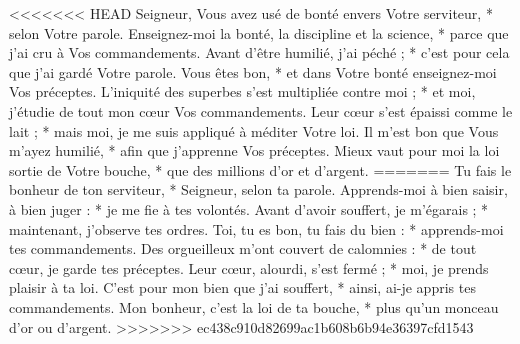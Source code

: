<<<<<<< HEAD
Seigneur, Vous avez usé de bonté envers Votre serviteur, * selon Votre parole.
\versseparator
Enseignez-moi la bonté, la discipline et la science, * parce que j'ai cru à Vos commandements.
\versseparator
Avant d'être humilié, j'ai péché ; * c'est pour cela que j'ai gardé Votre parole.
\versseparator
Vous êtes bon, * et dans Votre bonté enseignez-moi Vos préceptes.
\versseparator
L'iniquité des superbes s'est multipliée contre moi ; * et moi, j'étudie de tout mon cœur Vos commandements.
\versseparator
Leur cœur s'est épaissi comme le lait ; * mais moi, je me suis appliqué à méditer Votre loi.
\versseparator
Il m'est bon que Vous m'ayez humilié, * afin que j'apprenne Vos préceptes.
\versseparator
Mieux vaut pour moi la loi sortie de Votre bouche, * que des millions d'or et d'argent.
=======
Tu fais le bonheur de ton serviteur, *
Seigneur, selon ta parole.
\versseparator
Apprends-moi à bien saisir, à bien juger : *
je me fie à tes volontés.
\versseparator
Avant d’avoir souffert, je m’égarais ; *
maintenant, j’observe tes ordres.
\versseparator
Toi, tu es bon, tu fais du bien : *
apprends-moi tes commandements.
\versseparator
Des orgueilleux m’ont couvert de calomnies : *
de tout cœur, je garde tes préceptes.
\versseparator
Leur cœur, alourdi, s’est fermé ; *
moi, je prends plaisir à ta loi.
\versseparator
C’est pour mon bien que j’ai souffert, *
ainsi, ai-je appris tes commandements.
\versseparator
Mon bonheur, c’est la loi de ta bouche, *
plus qu’un monceau d’or ou d’argent.
>>>>>>> ec438c910d82699ac1b608b6b94e36397cfd1543
